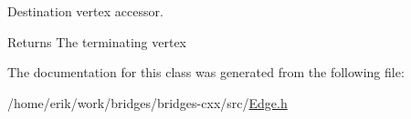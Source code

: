 Destination vertex accessor. 

\begin{DoxyReturn}{Returns}
The terminating vertex 
\end{DoxyReturn}


The documentation for this class was generated from the following file\+:\begin{DoxyCompactItemize}
\item 
/home/erik/work/bridges/bridges-\/cxx/src/\hyperlink{_edge_8h}{Edge.\+h}\end{DoxyCompactItemize}
